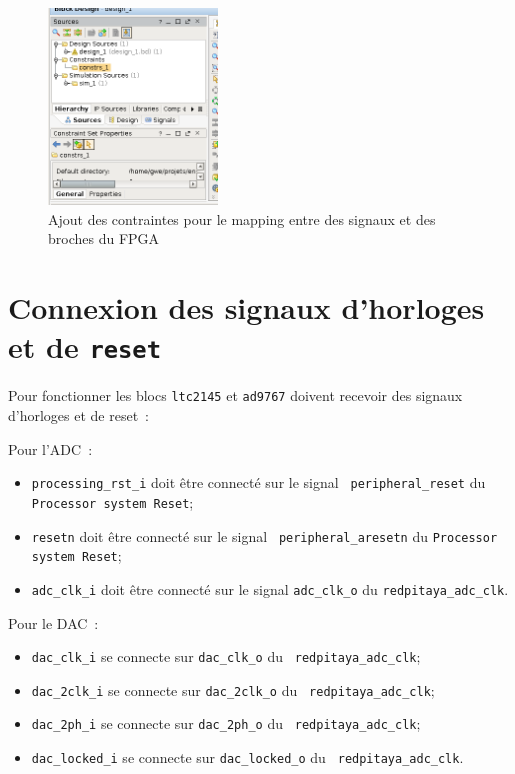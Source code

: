 \documentclass[12pt,oneside]{article}
\begin{document}
\begin{figure}[h!tb]
\begin{center}
\includegraphics[width=0.4\textwidth]{addSources}
\end{center}
\caption{Ajout des contraintes pour le mapping entre des signaux et des broches
du FPGA}
\label{addSources}
\end{figure}

\section{Connexion des signaux d'horloges et de {\tt reset}}

Pour fonctionner les blocs {\tt ltc2145} et {\tt ad9767} doivent recevoir des
signaux d'horloges et de reset~:

Pour l'ADC~:
\begin{itemize}
\item {\tt processing\_rst\_i} doit \^etre connect\'e sur le signal {\tt
peripheral\_reset} du {\tt Processor system Reset};
\item {\tt resetn} doit \^etre connect\'e sur le signal {\tt
peripheral\_aresetn} du {\tt Processor system Reset};
\item {\tt adc\_clk\_i} doit \^etre connect\'e sur le signal {\tt adc\_clk\_o}
du {\tt redpitaya\_adc\_clk}.
\end{itemize}

Pour le DAC~:
\begin{itemize}
\item {\tt dac\_clk\_i} se connecte sur {\tt dac\_clk\_o} du {\tt
redpitaya\_adc\_clk};
\item {\tt dac\_2clk\_i} se connecte sur {\tt dac\_2clk\_o} du {\tt
redpitaya\_adc\_clk};
\item {\tt dac\_2ph\_i} se connecte sur {\tt dac\_2ph\_o} du {\tt
redpitaya\_adc\_clk};
\item {\tt dac\_locked\_i} se connecte sur {\tt dac\_locked\_o} du {\tt
redpitaya\_adc\_clk}.
\end{itemize}
\end{document}
